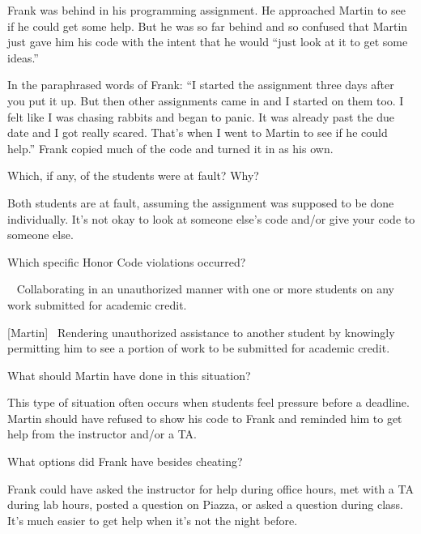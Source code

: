 
Frank was behind in his programming assignment.
He approached Martin to see if he could get some help.
But he was so far behind and so confused that Martin just gave him his code with the intent that he would ``just look at it to get some ideas.''

\vspace{1em}

In the paraphrased words of Frank: ``I started the assignment three days after you put it up.
But then other assignments came in and I started on them too.
I felt like I was chasing rabbits and began to panic.
It was already past the due date and I got really scared.
That's when I went to Martin to see if he could help.''
Frank copied much of the code and turned it in as his own.




\Q Which, if any, of the students were at fault? Why?

\begin{answer}[6em]
Both students are at fault, assuming the assignment was supposed to be done individually.
It's not okay to look at someone else's code and/or give your code to someone else.
\end{answer}


\Q Which specific Honor Code violations occurred?

\begin{answer}[7em]
[Frank]~ Collaborating in an unauthorized manner with one or more students on any work submitted for academic credit.

\bigskip

[Martin]~ Rendering unauthorized assistance to another student by knowingly permitting him to see a portion of work to be submitted for academic credit.
\end{answer}


\Q What should Martin have done in this situation?

\begin{answer}[6em]
This type of situation often occurs when students feel pressure before a deadline.
Martin should have refused to show his code to Frank and reminded him to get help from the instructor and/or a TA.
\end{answer}


\Q What options did Frank have besides cheating?

\begin{answer}[6em]
Frank could have asked the instructor for help during office hours, met with a TA during lab hours, posted a question on Piazza, or asked a question during class.
It's much easier to get help when it's not the night before.
\end{answer}

